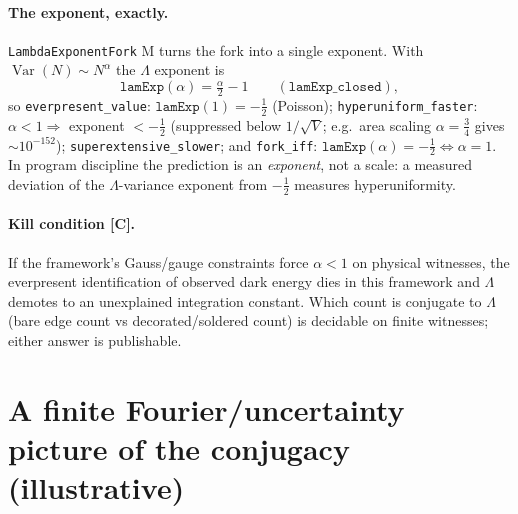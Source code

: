 \documentclass[11pt]{article}
\newcommand{\Lam}{\Lambda}
\newcommand{\Kernel}{\textcolor{kcol}{\textsc{M}}}       %
\newcommand{\Conj}{\textcolor{ccol}{\textsc{[C]}}}        %
\newcommand{\lm}[1]{\texttt{#1}}
\begin{document}
\paragraph{The exponent, exactly.}  \lm{LambdaExponentFork} \Kernel{} turns the
fork into a single exponent.  With $\operatorname{Var}(N)\sim N^\alpha$ the
$\Lam$ exponent is
\[
  \lm{lamExp}(\alpha)=\tfrac{\alpha}{2}-1
  \qquad(\lm{lamExp\_closed}),
\]
so \lm{everpresent\_value}: $\lm{lamExp}(1)=-\tfrac12$ (Poisson);
\lm{hyperuniform\_faster}: $\alpha<1\Rightarrow$ exponent $<-\tfrac12$
(suppressed below $1/\sqrt V$; e.g.\ area scaling $\alpha=\tfrac34$ gives
$\sim10^{-152}$); \lm{superextensive\_slower}; and \lm{fork\_iff}:
$\lm{lamExp}(\alpha)=-\tfrac12\iff\alpha=1$.  In program discipline the
prediction is an \emph{exponent}, not a scale: a measured deviation of the
$\Lam$-variance exponent from $-\tfrac12$ measures hyperuniformity.

\paragraph{Kill condition \Conj.}  If the framework's Gauss/gauge constraints
force $\alpha<1$ on physical witnesses, the everpresent identification of
observed dark energy dies in this framework and $\Lam$ demotes to an unexplained
integration constant.  Which count is conjugate to $\Lam$ (bare edge count vs
decorated/soldered count) is decidable on finite witnesses; either answer is
publishable.

\section{A finite Fourier/uncertainty picture of the conjugacy (illustrative)}
\end{document}
